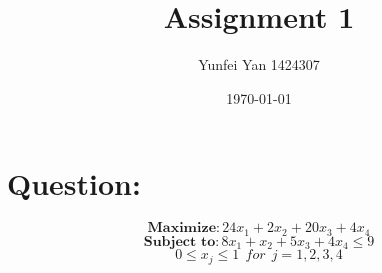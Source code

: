 \documentclass{article} %
\title{	 Assignment 1
}
\author{Yunfei Yan 1424307} %
\date{\normalsize\today} %
\numberwithin{equation}{section} %
\numberwithin{figure}{section} %
\numberwithin{table}{section} %
\begin{document}
\maketitle %


\section*{Question:}
\begin{equation*}
\textbf{Maximize}: 24x_1+2x_2+20x_3+4x_4
\end{equation*}
\begin{equation*}
\textbf{Subject to}: 8x_1+x_2+5x_3+4x_4\leq9
\end{equation*}
\begin{equation*}
0\leq x_j\leq1 \ \ for \ \ j=1,2,3,4
\end{equation*}
\end{document}
